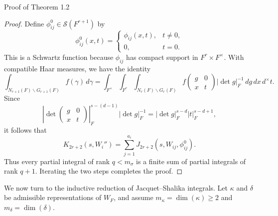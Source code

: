 \documentclass[12pt,reqno]{amsart}
\numberwithin{equation}{section}%
\numberwithin{equation}{subsection}
\theoremstyle{definition}
\theoremstyle{remark}
\begin{document}
\begin{section}{Proof of Theorem 1.2}
\begin{proof}
Define $\phi_{ij}^0\in\mathcal{S}(F^{r+1})$ by
\[
  \phi_{ij}^0(x,t) = \begin{cases} \phi_{ij}(x,t),&t\neq0,\\ 0,&t=0. \end{cases}
\]
This is a Schwartz function because $\phi_{ij}$ has compact support in $F^r\times F^\times$. With compatible Haar measures, we have the identity
\[
  \int_{N_{r+1}(F)\backslash G_{r+1}(F)}f(\gamma)\,d\gamma = \int_{F^\times} \int_{F^r} \int_{N_r(F)\backslash G_r(F)} f\begin{pmatrix}g&0\\x&t\end{pmatrix} |\det g|_F^{-1}\,dg\,dx\,d^\times t.
\]
Since
\[
  \left| \det\begin{pmatrix}g&0\\x&t\end{pmatrix} \right|_F^{s-(d-1)} |\det g|_F^{-1} = |\det g|_F^{s-d}|t|_F^{s-d+1},
\]
it follows that
\[
  K_{2r+2}(s,W_i'') = \sum_{j=1}^{a_i}J_{2r+2}(s,W_{ij},\phi_{ij}^0).
\]
Thus every partial integral of rank $q<m_\sigma$ is a finite sum of partial integrals of rank $q+1$. Iterating the two steps completes the proof.
\end{proof}


We now turn to the inductive reduction of Jacquet--Shalika integrals. Let $\kappa$ and $\delta$ be admissible representations of $W_F$, and assume $m_\kappa = \dim(\kappa) \ge 2$ and $m_\delta = \dim(\delta)$. 


\end{section}
\end{document}

